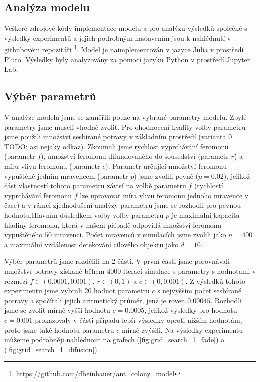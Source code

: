\documentclass[10pt,a4paper,twocolumn]{article}
\begin{document}
\subsection*{Analýza modelu}

Veškeré zdrojové kódy implementace modelu a pro analýzu výsledků společně s
výsledky experimentů a jejich podrobným nastavením jsou k nahlédnutí v 
githubovém repozitáři 
\footnote{\url{https://github.com/dbeinhauer/ant_colony_model}}. Model je 
naimplementován v jazyce Julia v prostředí Pluto. Výsledky byly analyzovány
za pomoci jazyku Python v prostředí Jupyter Lab.

\subsection*{Výběr parametrů}
V analýze modelu jsme se zaměřili pouze na vybrané parametry modelu. Zbylé
parametry jsme museli vhodně zvolit. Pro ohodnocení kvality volby
parametrů jsme použili množství sesbírané potravy v základním prostředí
(varianta 0 TODO: asi nejaky odkaz). Zkoumali jsme rychlost 
vyprchávání feromonu (parametr $f$), množství feromonu difundovaného do 
sousedství (parametr $r$) a míru vlivu feromonu (parametr $c$). Parametr
určující množství feromonu vypuštěné jedním mravencem (parametr $p$) jsme
zvolili pevně ($p = 0.02$), jelikož část vlastností tohoto parametru závisí
na volbě parametru $f$ (rychlostí vyprchávání feromonu $f$ lze upravovat
míra vlivu feromonu jednoho mravence v čase) a v rámci zjednodušení analýzy
parametrů jsme se rozhodli pro pevnou hodnotu.Hlavním důsledkem volby 
volby parametru $p$ je maximální kapacita hladiny feromonu, která v našem 
případě odpovídá množství feromonu vypuštěného $50$ mravenci. Počet 
mravenců v simulacích jsme zvolili jako $n = 400$ a maximální vzdálenost 
detekování cílového objektu jako $d = 10$. 

Výběr parametrů jsme rozdělili na 2 části. V první části jsme porovnávali
množství potravy získané během $4000$ iterací simulace s parametry s 
hodnotami v rozmezí $f \in (0.0001, 0.001)$, $r \in (0, 1)$ a 
$c \in (0, 0.001)$. Z výsledků tohoto experimentu jsme vybrali 20 
hodnot parametru $c$ s nejvyšším počet sesbírané potravy a spočítali 
jejich aritmetický průměr, jenž je roven $0.00045$. Rozhodli jsme se 
zvolit mírně vyšší hodnotu $c = 0.0005$, jelikož výsledky pro hodnotu 
$c=0.001$ prokazovaly v části případů lepší výsledky oproti nižším hodnotám, 
proto jsme také hodnotu parametru $c$ mírně zvýšili. Na výsledky experimentu
můžeme podrobněji nahlédnout na grafech (\ref{fig:grid_search_1_fade}) a 
(\ref{fig:grid_search_1_difusion}).
\end{document}
